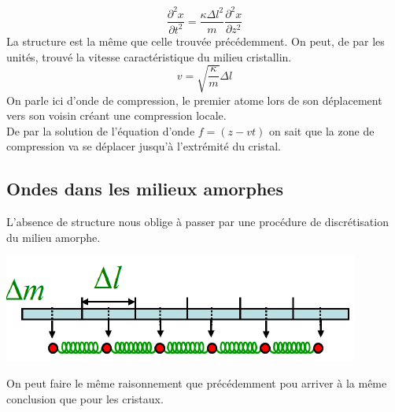 \documentclass	[11pt, a4paper, openany]{book}
\begin{document}
		\begin{equation}
			\frac{\partial^2 x}{\partial t^2} = \frac{\kappa\Delta l^2}{m}\frac{\partial^2x}{\partial z^2}
		\end{equation}
		La structure est la même que celle trouvée précédemment.  On peut, de par les unités, trouvé la vitesse caractéristique du milieu cristallin.
		\begin{equation}
			v = \sqrt{\frac{\kappa}{m}}\Delta l
		\end{equation}
		On parle ici d'onde de compression, le premier atome lors de son déplacement vers son voisin créant une compression locale.\\
		De par la solution de l'équation d'onde $f = (z - vt)$ on sait que la zone de compression va se déplacer jusqu'à l'extrémité du cristal.
		
		\subsection{Ondes dans les milieux amorphes}
		L'absence de structure nous oblige à passer par une procédure de discrétisation du milieu amorphe. 
		\begin{center}
			\includegraphics[scale=0.4]{oo/image27.png}
		\end{center}
		On peut faire le même raisonnement que précédemment pou arriver à la même conclusion que pour les cristaux.
		
\end{document}

